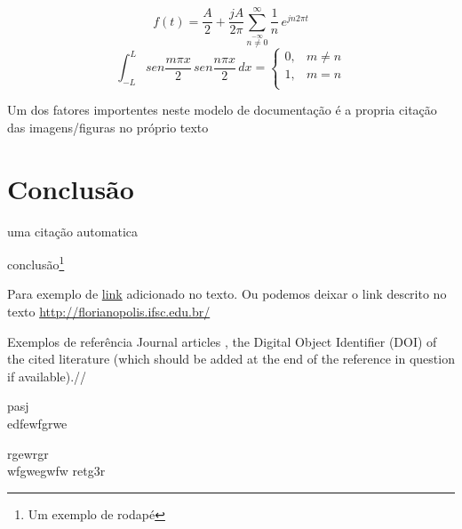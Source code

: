 \documentclass[a4paper, 12pt]{article}
\begin{document}
\begin{equation}
f(t)= \frac{A}{2} + \frac{jA}{2 \pi }
\sum_{\stackrel{-\infty}{n
\neq 0}}^{\infty} \frac{1}{n} \, e^{jn2\pi t}
\end{equation}
\begin{equation}
\int_{-L}^{L} sen \frac{m \pi x}{2}\,sen \frac{n \pi x}{2}\,dx =
\left \{
\begin{array}{cc}
0, & m \neq n \\
1, & m = n \\
\end{array}
\right.
\end{equation}

Um dos fatores importentes neste modelo de documentação é a propria citação das imagens/figuras no próprio texto

\section{Conclusão}
uma citação automatica \cite{burns1961management}

conclusão\footnote{Um exemplo de rodapé}

Para exemplo de   \textcolor{red}{\href{www.google.com.br}{link}} adicionado no texto. Ou podemos deixar o link descrito no texto \url{http://florianopolis.ifsc.edu.br/}

Exemplos de referência Journal articles \cite[cita a pagina 789]{batista2015embarcaccao}, the Digital
Object Identifier (DOI) of the cited literature (which should be added
at the end of the reference in question if available).//

pasj\\edfewfgrwe\\ \par rgewrgr\\wfgwegwfw\cite{dvhdl} retg3r

\end{document}
